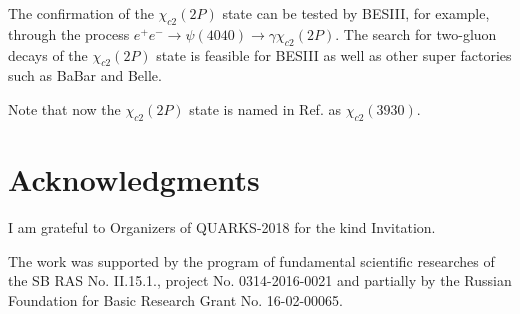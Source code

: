\documentclass[aps,preprint,groupedaddress,floatfix]{revtex4}
\begin{document}
 The confirmation of the $\chi_{c2}(2P)$ state can be
tested by BESIII, for example, through the process
$e^+e^-\to\psi(4040)\to \gamma \chi_{c2}(2P)$. The search for
two-gluon decays of the $\chi_{c2}(2P)$ state is feasible for
BESIII as well as other super factories such as BaBar and Belle.

Note that now the $\chi_{c2}(2P)$ state is named in Ref.
\cite{pdg-2018} as $\chi_{c2}(3930)$.

\section{Acknowledgments}

  I am grateful to
Organizers of QUARKS-2018 for the kind Invitation.

The work was supported by the program of fundamental scientific
researches of the SB RAS No. II.15.1., project No. 0314-2016-0021
and  partially  by the Russian Foundation for Basic Research Grant
No. 16-02-00065.
\end{document}
